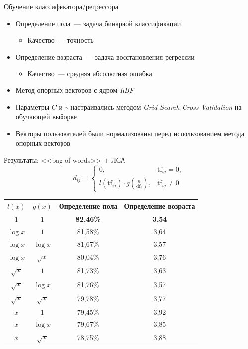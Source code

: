 \documentclass{beamer}
\begin{document}
\begin{frame}{Обучение классификатора/регрессора}
  \begin{itemize}
      \item {Определение пола~--- задача бинарной классификации}
          \begin{itemize}
              \item {Качество~--- точность}
          \end{itemize}
      \item {Определение возраста~--- задача восстановления регрессии}
          \begin{itemize}
              \item {Качество~--- средняя абсолютная ошибка}
          \end{itemize}
      \item {Метод опорных векторов с ядром \textit{RBF}}
      \item {Параметры $C$ и $\gamma$ настраивались методом \textit{Grid Search Cross Validation} на обучающей выборке}
      \item {Векторы пользователей были нормализованы перед использованием метода опорных векторов}
  \end{itemize}
\end{frame}

\begin{frame}{Результаты: <<bag of words>> + ЛСА}
    \[d_{ij} = \begin{cases}
              0,& \mathrm{tf}_{ij} = 0,\\
              l(\mathrm{tf}_{ij}) \cdot g(\frac{n}{\mathrm{df}_{i}}),& \mathrm{tf}_{ij} \ne 0
        \end{cases}\]
    \begin{table}[h!]
    \centering
    \begin{tabular}{|c|c|c|c|}
    \hline
    \boldmath$l(x)$ & \boldmath$g(x)$ & \textbf{Определение пола} & \textbf{Определение возраста} \tabularnewline
    \hline
    $1$ & $1$ & \textbf{82,46\%} & \textbf{3,54} \tabularnewline
    \hline
    $\log{x}$ & $1$ & 81,58\% & 3,64 \tabularnewline
    \hline
    $\log{x}$ & $\log{x}$ & 81,67\% & 3,57 \tabularnewline
    \hline
    $\log{x}$ & $\sqrt{x}$ & 80,04\% & 3,76 \tabularnewline
    \hline
    $\sqrt{x}$ & $1$ & 81,73\% & 3,63 \tabularnewline
    \hline
    $\sqrt{x}$ & $\log{x}$ & 81,76\% & 3,57 \tabularnewline
    \hline
    $\sqrt{x}$ & $\sqrt{x}$ & 79,78\% & 3,77 \tabularnewline
    \hline
    $x$ & $1$ & 79,45\% & 3,92 \tabularnewline
    \hline
    $x$ & $\log{x}$ & 79,67\% & 3,85 \tabularnewline
    \hline
    $x$ & $\sqrt{x}$ & 78,75\% & 3,88 \tabularnewline
    \hline
    \end{tabular}
    \label{tab:bagofwords_lsa}
    \end{table}
\end{frame}
\end{document}
